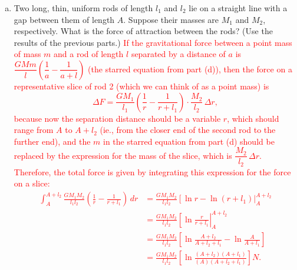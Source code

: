 \documentclass[12pt]{article}
\newcommand{\red}[1]{ \textcolor{red}{#1 } }
\begin{document}
\begin{enumerate}
\begin{enumerate}[(a)]
\item Two long, thin, uniform rods of length $l_1$ and $l_2$ lie on a straight line with a gap between them of length $A$. Suppose their masses are $M_1$ and $M_2$, respectively. What is the force of attraction between the rods? (Use the results of the previous parts.) 
\red{
If the gravitational force between a point mass of mass $m$ and a rod of length $l$ separated by a distance of $a$ is 
$\dfrac{GMm}{l}\left(\dfrac{1}{a} - \dfrac{1}{a+l}\right)$ (the starred equation from part (d)), then the force on a representative slice of rod 2 (which we can think of as a point mass) is 
\[\Delta F = \dfrac{GM_1}{l_1}\left(\dfrac{1}{r} - \dfrac{1}{r+l_1}\right)\cdot \dfrac{M_2}{l_2}\, \Delta r,\]
because now the separation distance should be a variable $r$, which should range from $A$ to $A+l_2$ (ie., from the closer end of the second rod to the further end), and the $m$ in the starred equation from part (d) should be replaced by the expression for the mass of the slice, which is $\dfrac{M_2}{l_2}\,\Delta r$.\\
Therefore, the total force is given by integrating this expression for the force on a slice: 
\begin{align*}
\int_A^{A+l_2} \frac{GM_1 M_2}{l_1 l_2}\left(\frac{1}{r} - \frac{1}{r+l_1}\right)\, dr
& = \frac{GM_1 M_2}{l_1 l_2}\left[\ln{r}-\ln{(r+l_1)}\right|_A^{A+l_2} \\
&= \frac{GM_1 M_2}{l_1 l_2}\left[\ln{\frac{r}{r+l_1}}\right|_A^{A+l_2} \\
&= \frac{GM_1 M_2}{l_1 l_2} 
\left[\ln{\frac{A+l_2}{A + l_2 + l_1}} - 
      \ln{\frac{A}{A+ l_1}}\right] \\
&= \frac{GM_1 M_2}{l_1 l_2} \left[\ln{\frac{(A+l_2)(A+l_1)}{(A)(A+l_2+l_1)}}\right] \si{N}.
\end{align*}
}
\end{enumerate}
\end{enumerate}
\red{}
\end{document}
